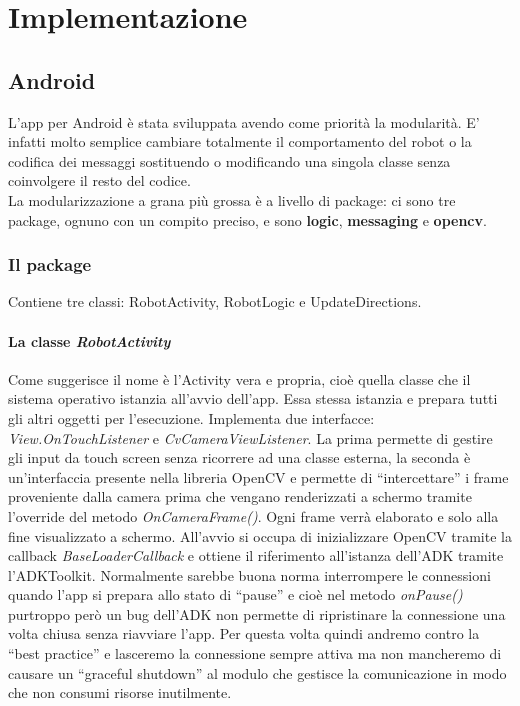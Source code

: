 \chapter{Implementazione}
\fancyfoot[C]{\thepage }
\section {Android}
L'app per Android è stata sviluppata avendo come priorità la modularità. E' 
infatti molto semplice cambiare totalmente il comportamento del robot o la 
codifica dei messaggi sostituendo o modificando una singola classe senza 
coinvolgere il resto del codice.\\
La modularizzazione a grana più grossa è a livello di package: ci sono tre package,
ognuno con un compito preciso, e sono \textbf{logic}, \textbf{messaging} e \textbf{opencv}.
\subsection {Il package }
Contiene tre classi: RobotActivity, RobotLogic e UpdateDirections.
\subsubsection{La classe \emph{RobotActivity}}
Come suggerisce il nome è l'Activity vera e propria, cioè quella classe che il 
sistema operativo istanzia all'avvio dell'app. Essa stessa istanzia e prepara tutti gli 
altri oggetti per l'esecuzione. Implementa due interfacce: \textit{View.OnTouchListener} 
e \textit{CvCameraViewListener}. 
La prima permette di gestire gli input da touch screen senza ricorrere ad una classe esterna,
la seconda è un'interfaccia presente nella libreria OpenCV e permette di ``intercettare''
i frame proveniente dalla camera prima che vengano renderizzati a schermo tramite 
l'override del metodo \textit{OnCameraFrame()}. Ogni frame verrà elaborato e solo alla
fine visualizzato a schermo.
All'avvio si occupa di inizializzare OpenCV tramite la 
callback \textit{BaseLoaderCallback} e ottiene il riferimento all'istanza dell'ADK
tramite l'ADKToolkit. Normalmente sarebbe buona norma interrompere le connessioni 
quando l'app si prepara allo stato di ``pause'' e cioè nel metodo \emph{onPause()}
 purtroppo però un bug dell'ADK non permette di ripristinare la connessione una 
 volta chiusa senza riavviare l'app. Per questa volta quindi andremo contro la 
 ``best practice'' e lasceremo la connessione sempre attiva ma non mancheremo di 
 causare un ``graceful shutdown'' al modulo che gestisce la comunicazione in modo 
 che non consumi risorse inutilmente.

